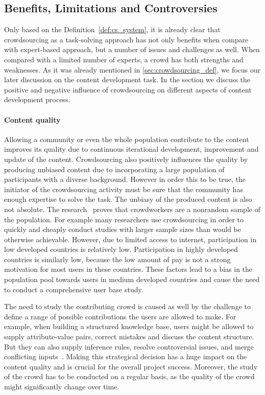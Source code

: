 \documentclass[ngerman,UKenglish,table]{scrbook}
\begin{document}
\subsection{Benefits, Limitations and Controversies}

Only based on the Definition~\autoref{def:cs_system}, it is already clear that crowdsourcing as a task-solving approach has not only benefits when compare with expert-based approach, but a number of issues and challenges as well.
When compared with a limited number of experts, a crowd has both strengths and weaknesses.
As it was already mentioned in \autoref{sec:crowdsourcing_def}, we focus our later discussion on the content development task.
In the section we discuss the positive and negative influence of crowdsourcing on different aspects of content development process.

\paragraph{Content quality}

Allowing a community or even the whole population contribute to the content improves its quality due to continuous iterational development, improvement and update of the content.
Crowdsourcing also positively influences the quality by producing unbiased content due to incorporating a large population of participants with a diverse background. 
However in order this to be true, the initiator of the crowdsourcing activity must be sure that the community has enough expertise to solve the task.
The unbiasy of the produced content is also not absolute.
The research~\cite{hirth2011human} proves that crowdworkers are a nonrandom sample of the population.
For example many researchers use crowdsourcing in order to quickly and cheaply conduct studies with larger sample sizes than would be otherwise achievable.
However, due to limited access to internet, participation in low developed countries is relatively low.
Participation in highly developed countries is similarly low, because the low amount of pay is not a strong motivation for most users in these countries.
These factors lead to a bias in the population pool towards users in medium developed countries and cause the need to conduct a comprehensive user base study.

The need to study the contributing crowd is caused as well by the challenge to define a range of possible contributions the users are allowed to make. 
For example, when building a structured knowledge base, users might be allowed to supply attribute-value pairs, correct mistakes and discuss the content structure.
But they can also supply inference rules, resolve controversial issues, and merge conflicting inputs~\cite{richardson2003building}.
Making this strategical decision has a huge impact on the content quality and is crucial for the overall project success.
Moreover, the study of the crowd has to be conducted on a regular basis, as the quality of the crowd might significantly change over time.
\end{document}
